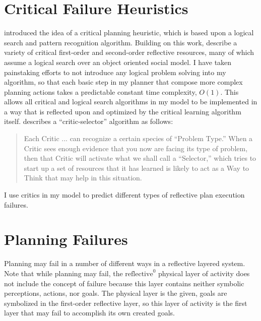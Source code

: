 \section{Critical Failure Heuristics}

\cite{sussman:1973} introduced the idea of a critical planning
heuristic, which is based upon a logical search and pattern
recognition algorithm.  Building on this work, \cite{singh:2003,
  singh:2005a} describe a variety of critical first-order and
second-order reflective resources, many of which assume a logical
search over an object oriented social model.  I have taken painstaking
efforts to not introduce any logical problem solving into my
algorithm, so that each basic step in my planner that compose more
complex planning actions takes a predictable constant time complexity,
$O(1)$.  This allows all critical and logical search algorithms in my
model to be implemented in a way that is reflected upon and optimized
by the critical learning algorithm itself.  \cite{minsky:2006}
describes a ``critic-selector'' algorithm as follows:
\begin{quote}
Each Critic ... can recognize a certain species of ``Problem Type.''
When a Critic sees enough evidence that you now are facing its type of
problem, then that Critic will activate what we shall call a
``Selector,'' which tries to start up a set of resources that it has
learned is likely to act as a Way to Think that may help in this
situation.
\end{quote}
I use critics in my model to predict different types of reflective
plan execution failures.

\section{Planning Failures}

Planning may fail in a number of different ways in a reflective
layered system.  Note that while planning may fail, the
$\text{reflective}^0$ physical layer of activity does not include the
concept of failure because this layer contains neither symbolic
perceptions, actions, nor goals.  The physical layer is the given,
goals are symbolized in the first-order reflective layer, so this
layer of activity is the first layer that may fail to accomplish its
own created goals.

